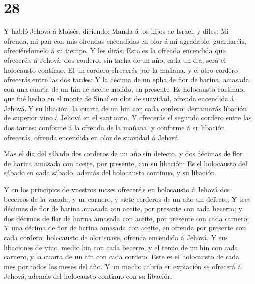 \hypertarget{section-27}{%
\section{28}\label{section-27}}

 Y habló Jehová á Moisés, diciendo:  Manda á los
hijos de Israel, y diles: Mi ofrenda, mi pan con mis ofrendas encendidas
en olor á mí agradable, guardaréis, ofreciéndomelo á su tiempo.
 Y les dirás: Esta es la ofrenda encendida que ofreceréis á
Jehová: dos corderos sin tacha de un año, cada un día, será el
holocausto continuo.  El un cordero ofrecerás por la mañana,
y el otro cordero ofrecerás entre las dos tardes:  Y la
décima de un epha de flor de harina, amasada con una cuarta de un hin de
aceite molido, en presente.  Es holocausto continuo, que fué
hecho en el monte de Sinaí en olor de suavidad, ofrenda encendida á
Jehová.  Y su libación, la cuarta de un hin con cada
cordero: derramarás libación de superior vino á Jehová en el santuario.
 Y ofrecerás el segundo cordero entre las dos tardes:
conforme á la ofrenda de la mañana, y conforme á su libación ofrecerás,
ofrenda encendida en olor de suavidad á Jehová.

 Mas el día del sábado dos corderos de un año sin defecto, y
dos décimas de flor de harina amasada con aceite, por presente, con su
libación:  Es el holocausto del sábado en cada sábado,
además del holocausto continuo, y su libación.

 Y en los principios de vuestros meses ofreceréis en
holocausto á Jehová dos becerros de la vacada, y un carnero, y siete
corderos de un año sin defecto;  Y tres décimas de flor de
harina amasada con aceite, por presente con cada becerro; y dos décimas
de flor de harina amasada con aceite, por presente con cada carnero;
 Y una décima de flor de harina amasada con aceite, en
ofrenda por presente con cada cordero: holocausto de olor suave, ofrenda
encendida á Jehová.  Y sus libaciones de vino, medio hin
con cada becerro, y el tercio de un hin con cada carnero, y la cuarta de
un hin con cada cordero. Este es el holocausto de cada mes por todos los
meses del año.  Y un macho cabrío en expiación se ofrecerá
á Jehová, además del holocausto continuo con su libación.

